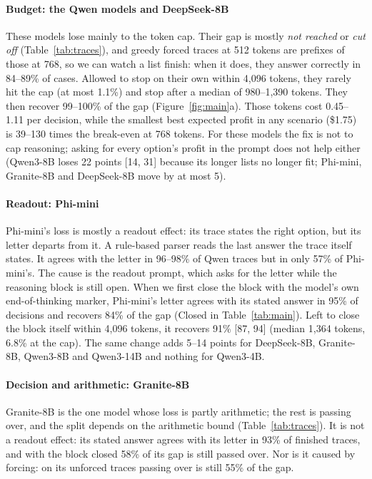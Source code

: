 \documentclass[sigconf,review,anonymous]{acmart}
\begin{document}
\paragraph{Budget: the Qwen models and DeepSeek-8B}
These models lose mainly to the token cap. Their gap is mostly \emph{not reached} or \emph{cut off} (Table~\ref{tab:traces}), and greedy forced traces at 512 tokens are prefixes of those at 768, so we can watch a list finish: when it does, they answer correctly in 84--89\% of cases. Allowed to stop on their own within 4{,}096 tokens, they rarely hit the cap (at most 1.1\%) and stop after a median of 980--1{,}390 tokens. They then recover 99--100\% of the gap (Figure~\ref{fig:main}a). Those tokens cost 0.45--1.11\textcent{} per decision, while the smallest best expected profit in any scenario (\$1.75) is 39--130 times the break-even at 768 tokens. For these models the fix is not to cap reasoning; asking for every option's profit in the prompt does not help either (Qwen3-8B loses 22 points [14, 31] because its longer lists no longer fit; Phi-mini, Granite-8B and DeepSeek-8B move by at most 5).

\paragraph{Readout: Phi-mini}
Phi-mini's loss is mostly a readout effect: its trace states the right option, but its letter departs from it. A rule-based parser reads the last answer the trace itself states. It agrees with the letter in 96--98\% of Qwen traces but in only 57\% of Phi-mini's. The cause is the readout prompt, which asks for the letter while the reasoning block is still open. When we first close the block with the model's own end-of-thinking marker, Phi-mini's letter agrees with its stated answer in 95\% of decisions and recovers 84\% of the gap (Closed in Table~\ref{tab:main}). Left to close the block itself within 4{,}096 tokens, it recovers 91\% [87, 94] (median 1{,}364 tokens, 6.8\% at the cap). The same change adds 5--14 points for DeepSeek-8B, Granite-8B, Qwen3-8B and Qwen3-14B and nothing for Qwen3-4B.

\paragraph{Decision and arithmetic: Granite-8B}
Granite-8B is the one model whose loss is partly arithmetic; the rest is passing over, and the split depends on the arithmetic bound (Table~\ref{tab:traces}). It is not a readout effect: its stated answer agrees with its letter in 93\% of finished traces, and with the block closed 58\% of its gap is still passed over. Nor is it caused by forcing: on its unforced traces passing over is still 55\% of the gap.
\end{document}
